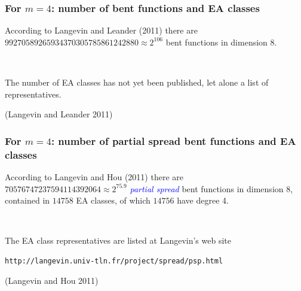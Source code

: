 \documentclass[pdf,sprung,slideColor,nocolorBG]{beamer}
\newenvironment{colortheme}[1]{
\def\ProvidesPackageRCS $##1${\relax}
\renewcommand{\ProcessOptions}{\relax}
\makeatletter

\makeatother
}{}
\newcommand{\slidecite}[1]{\tiny{(#1)}\normalsize{}}
\newcommand{\Emph}[1]{\emph{\textcolor{blue}{#1}}}
\begin{document}
\begin{colortheme}{seagull}
\begin{frame}
\frametitle{For $m=4$: number of bent functions and EA classes}

According to Langevin and Leander (2011)
there are $99270589265934370305785861242880 \approx 2^{106}$ bent functions in dimension 8.

~

The number of EA classes has not yet been published, let alone a list of representatives.

\slidecite{Langevin and Leander 2011}
\end{frame}
\begin{frame}[fragile]
\frametitle{For $m=4$: number of partial spread bent functions and EA classes}

According to Langevin and Hou (2011)
there are $70576747237594114392064 \approx 2^{75.9}$ \Emph{partial spread} bent functions in dimension 8,
contained in $14758$ EA classes, of which $14756$ have degree 4.

~

The EA class representatives are listed at Langevin's web site

\begin{verbatim}
http://langevin.univ-tln.fr/project/spread/psp.html
\end{verbatim}

\slidecite{Langevin and Hou 2011}
\end{frame}
\end{colortheme}
\end{document}
